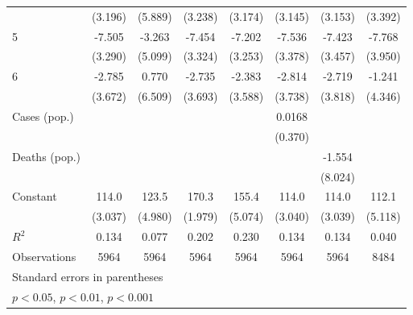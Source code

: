 \documentclass{article}
\begin{document}
{\begin{longtable}{l*{7}{c}}
                &  (3.196)         &  (5.889)         &  (3.238)         &  (3.174)         &  (3.145)         &  (3.153)         &  (3.392)         \\
5               &   -7.505\sym{*}  &   -3.263         &   -7.454\sym{*}  &   -7.202\sym{*}  &   -7.536\sym{*}  &   -7.423\sym{*}  &   -7.768         \\
                &  (3.290)         &  (5.099)         &  (3.324)         &  (3.253)         &  (3.378)         &  (3.457)         &  (3.950)         \\
6               &   -2.785         &    0.770         &   -2.735         &   -2.383         &   -2.814         &   -2.719         &   -1.241         \\
                &  (3.672)         &  (6.509)         &  (3.693)         &  (3.588)         &  (3.738)         &  (3.818)         &  (4.346)         \\
Cases (pop.)    &                  &                  &                  &                  &   0.0168         &                  &                  \\
                &                  &                  &                  &                  &  (0.370)         &                  &                  \\
Deaths (pop.)   &                  &                  &                  &                  &                  &   -1.554         &                  \\
                &                  &                  &                  &                  &                  &  (8.024)         &                  \\
Constant        &    114.0\sym{***}&    123.5\sym{***}&    170.3\sym{***}&    155.4\sym{***}&    114.0\sym{***}&    114.0\sym{***}&    112.1\sym{***}\\
                &  (3.037)         &  (4.980)         &  (1.979)         &  (5.074)         &  (3.040)         &  (3.039)         &  (5.118)         \\
\hline
\(R^{2}\)       &    0.134         &    0.077         &    0.202         &    0.230         &    0.134         &    0.134         &    0.040         \\
Observations    &     5964         &     5964         &     5964         &     5964         &     5964         &     5964         &     8484         \\
\hline\hline
\multicolumn{8}{l}{\footnotesize Standard errors in parentheses}\\
\multicolumn{8}{l}{\footnotesize \sym{*} \(p<0.05\), \sym{**} \(p<0.01\), \sym{***} \(p<0.001\)}\\
\end{longtable}
}
\end{document}
